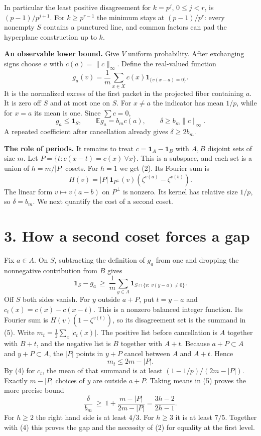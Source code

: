 \documentclass[11pt,letterpaper]{article}
\newcommand{\E}{\mathbb E}
\newcommand{\ind}{\mathbf 1}
\newcommand{\heading}[1]{\section*{\color{ink}#1}}
\newcommand{\subhead}[1]{\par\smallskip\noindent\textbf{#1.}\enspace}
\begin{document}
In particular the least positive disagreement for $k=p^j$, $0\le j<r$, is $(p-1)/p^{j+1}$. For $k\ge p^{r-1}$ the minimum stays at $(p-1)/p^r$: every nonempty $S$ contains a punctured line, and common factors can pad the hyperplane construction up to $k$.

\subhead{An observable lower bound}
Give $V$ uniform probability. After exchanging signs choose $a$ with $c(a)=\|c\|_\infty$. Define the real-valued function
\[
 g_a(v)=\frac1m\sum_{x\in X}c(x)\ind_{\{v(x-a)=0\}}.
\]
It is the normalized excess of the first packet in the projected fiber containing $a$. It is zero off $S$ and at most one on $S$. For $x\ne a$ the indicator has mean $1/p$, while for $x=a$ its mean is one. Since $\sum c=0$,
\[
        g_a\le\ind_S,\qquad \E g_a=b_m c(a),\qquad
        \delta\ge b_m\|c\|_\infty.                                  \tag{4}
\]
A repeated coefficient after cancellation already gives $\delta\ge 2b_m$.

\subhead{The role of periods}
It remains to treat $c=\ind_A-\ind_B$ with $A,B$ disjoint sets of size $m$. Let $P=\{t:c(x-t)=c(x)\ \forall x\}$. This is a subspace, and each set is a union of $h=m/|P|$ cosets. For $h=1$ we get (2). Its Fourier sum is
\[
 H(v)=|P|\,\ind_{P^\perp}(v)(\zeta^{v(a)}-\zeta^{v(b)}).
\]
The linear form $v\mapsto v(a-b)$ on $P^\perp$ is nonzero. Its kernel has relative size $1/p$, so $\delta=b_m$. We next quantify the cost of a second coset.

\newpage
\heading{3. How a second coset forces a gap}
Fix $a\in A$. On $S$, subtracting the definition of $g_a$ from one and dropping the nonnegative contribution from $B$ gives
\[
 \ind_S-g_a\ \ge\ \frac1m\sum_{y\in A}
          \ind_{S\cap\{v:\ v(y-a)\ne0\}}.                          \tag{5}
\]
Off $S$ both sides vanish. For $y$ outside $a+P$, put $t=y-a$ and $c_t(x)=c(x)-c(x-t)$. This is a nonzero balanced integer function. Its Fourier sum is $H(v)(1-\zeta^{v(t)})$, so its disagreement set is the summand in (5). Write $m_t=\tfrac12\sum_x|c_t(x)|$. The positive list before cancellation is $A$ together with $B+t$, and the negative list is $B$ together with $A+t$. Because $a+P\subset A$ and $y+P\subset A$, the $|P|$ points in $y+P$ cancel between $A$ and $A+t$. Hence
\[
                         m_t\le2m-|P|.
\]
By (4) for $c_t$, the mean of that summand is at least $(1-1/p)/(2m-|P|)$. Exactly $m-|P|$ choices of $y$ are outside $a+P$. Taking means in (5) proves the more precise bound
\[
 \boxed{\displaystyle\quad
  \frac{\delta}{b_m}\ \ge\ 1+\frac{m-|P|}{2m-|P|}
       =\frac{3h-2}{2h-1}.\quad}                                    \tag{6}
\]
For $h\ge2$ the right hand side is at least $4/3$. For $h\ge3$ it is at least $7/5$. Together with (4) this proves the gap and the necessity of (2) for equality at the first level.
\end{document}
